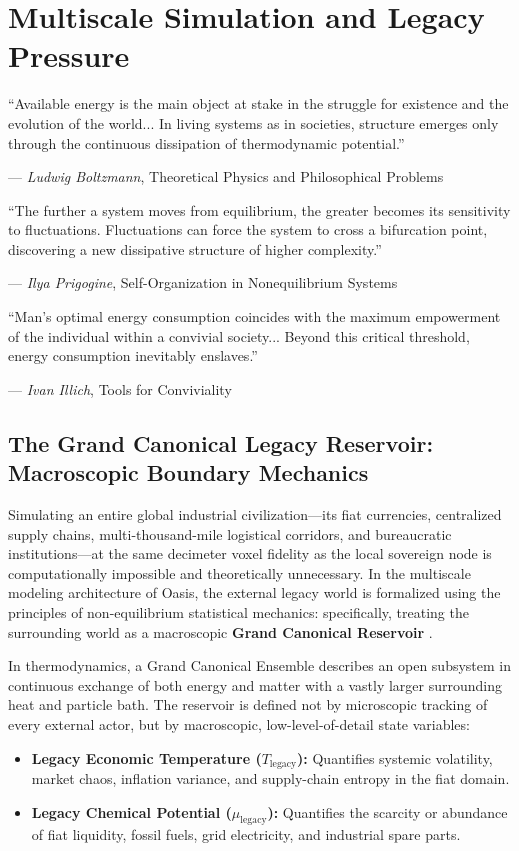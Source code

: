 \chapter{Multiscale Simulation and Legacy Pressure}
\label{chap:multiscale_legacy}

\epigraph{
    ``Available energy is the main object at stake in the struggle for existence and the evolution of the world... In living systems as in societies, structure emerges only through the continuous dissipation of thermodynamic potential.''
}{--- \textit{Ludwig Boltzmann}, \textnormal{Theoretical Physics and Philosophical Problems} \cite{pathria2011statistical}}

\epigraph{
    ``The further a system moves from equilibrium, the greater becomes its sensitivity to fluctuations. Fluctuations can force the system to cross a bifurcation point, discovering a new dissipative structure of higher complexity.''
}{--- \textit{Ilya Prigogine}, \textnormal{Self-Organization in Nonequilibrium Systems} \cite{prigogine1977time}}

\epigraph{
    ``Man's optimal energy consumption coincides with the maximum empowerment of the individual within a convivial society... Beyond this critical threshold, energy consumption inevitably enslaves.''
}{--- \textit{Ivan Illich}, \textnormal{Tools for Conviviality} \cite{illich1973}}

\section{The Grand Canonical Legacy Reservoir: Macroscopic Boundary Mechanics}
\label{sec:grand_canonical_reservoir}

Simulating an entire global industrial civilization---its fiat currencies, centralized supply chains, multi-thousand-mile logistical corridors, and bureaucratic institutions---at the same decimeter voxel fidelity as the local sovereign node is computationally impossible and theoretically unnecessary. In the multiscale modeling architecture of Oasis, the external legacy world is formalized using the principles of non-equilibrium statistical mechanics: specifically, treating the surrounding world as a macroscopic \textbf{Grand Canonical Reservoir} \cite{pathria2011statistical}.

In thermodynamics, a Grand Canonical Ensemble describes an open subsystem in continuous exchange of both energy and matter with a vastly larger surrounding heat and particle bath. The reservoir is defined not by microscopic tracking of every external actor, but by macroscopic, low-level-of-detail state variables:
\begin{itemize}
    \item \textbf{Legacy Economic Temperature ($T_{\mathrm{legacy}}$):} Quantifies systemic volatility, market chaos, inflation variance, and supply-chain entropy in the fiat domain.
    \item \textbf{Legacy Chemical Potential ($\mu_{\mathrm{legacy}}$):} Quantifies the scarcity or abundance of fiat liquidity, fossil fuels, grid electricity, and industrial spare parts.
\end{itemize}


